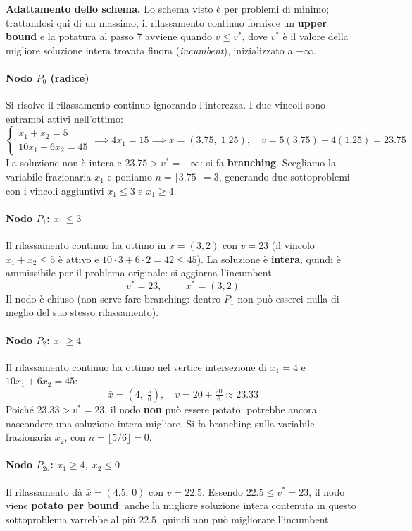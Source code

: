 \documentclass[12pt]{extarticle} %
\begin{document}
\noindent\textbf{Adattamento dello schema.} Lo schema visto è per problemi di minimo; trattandosi qui di un massimo, il rilassamento continuo fornisce un \textbf{upper bound} e la potatura al passo 7 avviene quando $v \le v^*$, dove $v^*$ è il valore della migliore soluzione intera trovata finora (\textit{incumbent}), inizializzato a $-\infty$.

\paragraph{Nodo $P_0$ (radice)}
Si risolve il rilassamento continuo ignorando l'interezza. I due vincoli sono entrambi attivi nell'ottimo:
\[
\begin{cases} x_1 + x_2 = 5\\ 10x_1 + 6x_2 = 45\end{cases}
\implies 4x_1 = 15 \implies \bar{x} = (3.75,\; 1.25), \quad v = 5(3.75)+4(1.25) = 23.75
\]
La soluzione non è intera e $23.75 > v^* = -\infty$: si fa \textbf{branching}. Scegliamo la variabile frazionaria $x_1$ e poniamo $n = \lfloor 3.75 \rfloor = 3$, generando due sottoproblemi con i vincoli aggiuntivi $x_1 \le 3$ e $x_1 \ge 4$.

\paragraph{Nodo $P_1$: $x_1 \le 3$}
Il rilassamento continuo ha ottimo in $\bar{x} = (3,2)$ con $v = 23$ (il vincolo $x_1+x_2\le 5$ è attivo e $10\cdot3+6\cdot2 = 42 \le 45$).
La soluzione è \textbf{intera}, quindi è ammissibile per il problema originale: si aggiorna l'incumbent
\[
v^* = 23, \hspace{1cm} x^* = (3,2)
\]
Il nodo è chiuso (non serve fare branching: dentro $P_1$ non può esserci nulla di meglio del suo stesso rilassamento).

\paragraph{Nodo $P_2$: $x_1 \ge 4$}
Il rilassamento continuo ha ottimo nel vertice intersezione di $x_1 = 4$ e $10x_1 + 6x_2 = 45$:
\[
\bar{x} = \left(4, \; \tfrac{5}{6}\right), \quad v = 20 + \tfrac{20}{6} \approx 23.33
\]
Poiché $23.33 > v^* = 23$, il nodo \textbf{non} può essere potato: potrebbe ancora nascondere una soluzione intera migliore. Si fa branching sulla variabile frazionaria $x_2$, con $n = \lfloor 5/6 \rfloor = 0$.

\paragraph{Nodo $P_{2a}$: $x_1 \ge 4, \; x_2 \le 0$}
Il rilassamento dà $\bar{x} = (4.5,\, 0)$ con $v = 22.5$. Essendo $22.5 \le v^* = 23$, il nodo viene \textbf{potato per bound}: anche la migliore soluzione intera contenuta in questo sottoproblema varrebbe al più $22.5$, quindi non può migliorare l'incumbent.
\end{document}
